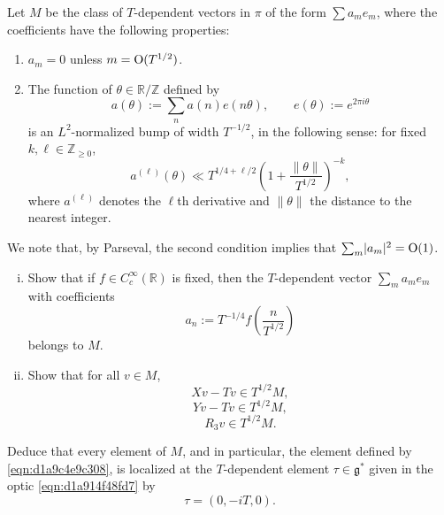 \documentclass[reqno]{amsart} 
\numberwithin{equation}{section}
\begin{document}
\begin{exercise}\label{exercise:d1a94c55524c}
  Let $M$ be the class of $T$-dependent vectors in $\pi$ of the form $\sum a_m e_m$, where the coefficients have the following properties:
  \begin{enumerate}
  \item $a_m = 0$ unless $m = \operatorname{O}(T^{1/2})$.
  \item The function of $\theta \in \mathbb{R} / \mathbb{Z}$ defined by
    \begin{equation*}
      a(\theta) := \sum_n a(n) e (n \theta), \qquad
      e(\theta) := e^{2 \pi i \theta }      
    \end{equation*}
    is an $L^2$-normalized bump of width $T^{-1/2}$, in the following sense: for fixed $k , \ell \in \mathbb{Z}_{\geq 0}$,
    \begin{equation}\label{eqn:d1a9c4e68198}
      a^{(\ell)}(\theta) \ll
       T^{1/4 + \ell/2} \left( 1+ \frac{\lVert \theta  \rVert}{T^{1/2}} \right)^{-k},
    \end{equation}
    where $a^{(\ell)}$ denotes the $\ell$th derivative and $\lVert \theta \rVert$ the distance to the nearest integer.
  \end{enumerate}
  We note that, by Parseval, the second condition implies that $\sum_m \lvert a_m \rvert^2 = \operatorname{O}(1)$.
  \begin{enumerate}[(i)]
  \item Show that if $f \in C_c^\infty(\mathbb{R})$ is fixed, then the $T$-dependent vector $\sum_m a_m e_m$ with coefficients
    \begin{equation}\label{eqn:d1a9c4e9c308}
      a_n := T^{-1/4} f\left( \frac{n}{T^{1/2}} \right)
    \end{equation}
    belongs to $M$.
  \item Show that for all $v \in M$,
    \begin{equation*}
      X v - T v \in T^{1/2} M,
    \end{equation*}
    \begin{equation*}
      Y v - T v \in T^{1/2} M,
    \end{equation*}
    \begin{equation*}
      R_3 v \in T^{1/2} M.
    \end{equation*}
  \end{enumerate}
  Deduce that every element of $M$, and in particular, the element defined by \eqref{eqn:d1a9c4e9c308}, is localized at the $T$-dependent element $\tau \in \mathfrak{g}^*$ given in the optic \eqref{eqn:d1a914f48fd7} by
  \begin{equation*}
    \tau = (0,-iT,0).
  \end{equation*}
\end{exercise}
\end{document}
